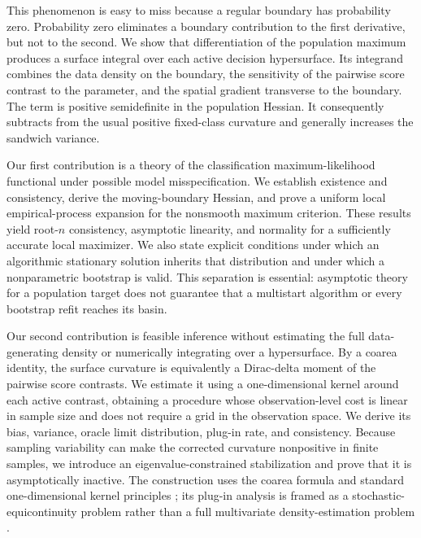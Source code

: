 \documentclass[numsec,webpdf,modern,medium,namedate]{oup-authoring-template}
\theoremstyle{plain}
\theoremstyle{definition}
\theoremstyle{remark}
\begin{document}
This phenomenon is easy to miss because a regular boundary has probability
zero.  Probability zero eliminates a boundary contribution to the first
derivative, but not to the second.  We show that differentiation of the
population maximum produces a surface integral over each active decision
hypersurface.  Its integrand combines the data density on the boundary, the
sensitivity of the pairwise score contrast to the parameter, and the spatial
gradient transverse to the boundary.  The term is positive semidefinite in the
population Hessian.  It consequently subtracts from the usual positive
fixed-class curvature and generally increases the sandwich variance.

Our first contribution is a theory of the classification maximum-likelihood
functional under possible model misspecification.  We establish existence and
consistency, derive the moving-boundary Hessian, and prove a uniform local
empirical-process expansion for the nonsmooth maximum criterion.  These
results yield root-$n$ consistency, asymptotic linearity, and normality for a
sufficiently accurate local maximizer.  We also state explicit conditions
under which an algorithmic stationary solution inherits that distribution and
under which a nonparametric bootstrap is valid.  This separation is essential:
asymptotic theory for a population target does not guarantee that a multistart
algorithm or every bootstrap refit reaches its basin.

Our second contribution is feasible inference without estimating the full
data-generating density or numerically integrating over a hypersurface.  By a
coarea identity, the surface curvature is equivalently a Dirac-delta moment of
the pairwise score contrasts.  We estimate it using a one-dimensional kernel
around each active contrast, obtaining a procedure whose observation-level
cost is linear in sample size and does not require a grid in the observation
space.  We derive its bias, variance, oracle limit distribution, plug-in rate,
and consistency.  Because sampling variability can make the corrected
curvature nonpositive in finite samples, we introduce an eigenvalue-constrained
stabilization and prove that it is asymptotically inactive.
The construction uses the coarea formula \citep{federer1969geometric} and
standard one-dimensional kernel principles \citep{silverman1986density,
wand1995kernel}; its plug-in analysis is framed as a stochastic-equicontinuity
problem rather than a full multivariate density-estimation problem
\citep{andrews1994empirical}.
\end{document}

